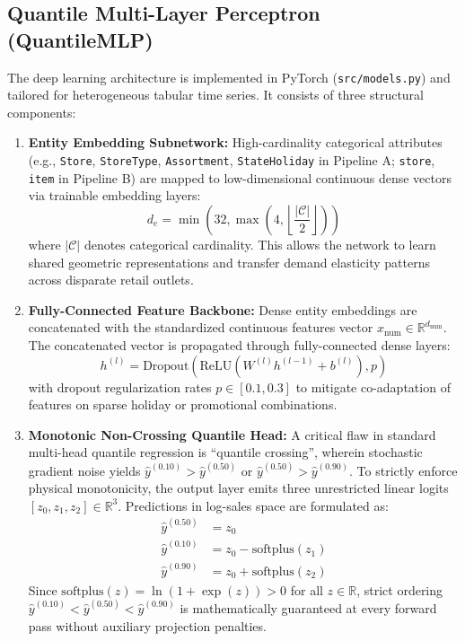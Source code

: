 \documentclass[11pt,a4paper]{article}
\begin{document}
\subsection{Quantile Multi-Layer Perceptron (QuantileMLP)}
The deep learning architecture is implemented in PyTorch (\texttt{src/models.py}) and tailored for heterogeneous tabular time series. It consists of three structural components:
\begin{enumerate}
    \item \textbf{Entity Embedding Subnetwork:} High-cardinality categorical attributes (e.g., \texttt{Store}, \texttt{StoreType}, \texttt{Assortment}, \texttt{StateHoliday} in Pipeline A; \texttt{store}, \texttt{item} in Pipeline B) are mapped to low-dimensional continuous dense vectors via trainable embedding layers:
    \begin{equation}
    d_e = \min\left(32, \max\left(4, \left\lfloor \frac{|\mathcal{C}|}{2} \right\rfloor \right)\right)
    \end{equation}
    where $|\mathcal{C}|$ denotes categorical cardinality. This allows the network to learn shared geometric representations and transfer demand elasticity patterns across disparate retail outlets.
    \item \textbf{Fully-Connected Feature Backbone:} Dense entity embeddings are concatenated with the standardized continuous features vector $x_{\text{num}} \in \mathbb{R}^{d_{\text{num}}}$. The concatenated vector is propagated through fully-connected dense layers:
    \begin{equation}
    h^{(l)} = \text{Dropout}\left(\text{ReLU}\left(W^{(l)} h^{(l-1)} + b^{(l)}\right), p\right)
    \end{equation}
    with dropout regularization rates $p \in [0.1, 0.3]$ to mitigate co-adaptation of features on sparse holiday or promotional combinations.
    \item \textbf{Monotonic Non-Crossing Quantile Head:} A critical flaw in standard multi-head quantile regression is ``quantile crossing'', wherein stochastic gradient noise yields $\hat{y}^{(0.10)} > \hat{y}^{(0.50)}$ or $\hat{y}^{(0.50)} > \hat{y}^{(0.90)}$. To strictly enforce physical monotonicity, the output layer emits three unrestricted linear logits $[z_0, z_1, z_2] \in \mathbb{R}^3$. Predictions in log-sales space are formulated as:
    \begin{align}
    \hat{y}^{(0.50)} &= z_0 \\
    \hat{y}^{(0.10)} &= z_0 - \text{softplus}(z_1) \\
    \hat{y}^{(0.90)} &= z_0 + \text{softplus}(z_2)
    \end{align}
    Since $\text{softplus}(z) = \ln(1 + \exp(z)) > 0$ for all $z \in \mathbb{R}$, strict ordering $\hat{y}^{(0.10)} < \hat{y}^{(0.50)} < \hat{y}^{(0.90)}$ is mathematically guaranteed at every forward pass without auxiliary projection penalties.
\end{enumerate}
\end{document}
